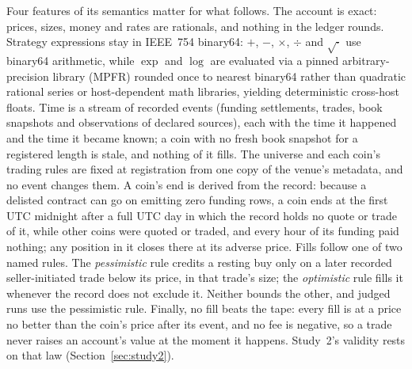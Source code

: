 \documentclass[11pt]{article}
\begin{document}
Four features of its semantics matter for what follows. The account is exact: prices, sizes, money and rates are rationals, and nothing in the ledger rounds. Strategy expressions stay in IEEE~754 binary64: $+$, $-$, $\times$, $\div$ and $\sqrt{\cdot}$ use binary64 arithmetic, while $\exp$ and $\log$ are evaluated via a pinned arbitrary-precision library (MPFR) rounded once to nearest binary64 rather than quadratic rational series or host-dependent math libraries, yielding deterministic cross-host floats. Time is a stream of recorded events (funding settlements, trades, book snapshots and observations of declared sources), each with the time it happened and the time it became known; a coin with no fresh book snapshot for a registered length is stale, and nothing of it fills. The universe and each coin's trading rules are fixed at registration from one copy of the venue's metadata, and no event changes them. A coin's end is derived from the record: because a delisted contract can go on emitting zero funding rows, a coin ends at the first UTC midnight after a full UTC day in which the record holds no quote or trade of it, while other coins were quoted or traded, and every hour of its funding paid nothing; any position in it closes there at its adverse price. Fills follow one of two named rules. The \emph{pessimistic} rule credits a resting buy only on a later recorded seller-initiated trade below its price, in that trade's size; the \emph{optimistic} rule fills it whenever the record does not exclude it. Neither bounds the other, and judged runs use the pessimistic rule. Finally, no fill beats the tape: every fill is at a price no better than the coin's price after its event, and no fee is negative, so a trade never raises an account's value at the moment it happens. Study~2's validity rests on that law (Section~\ref{sec:study2}).
\end{document}
